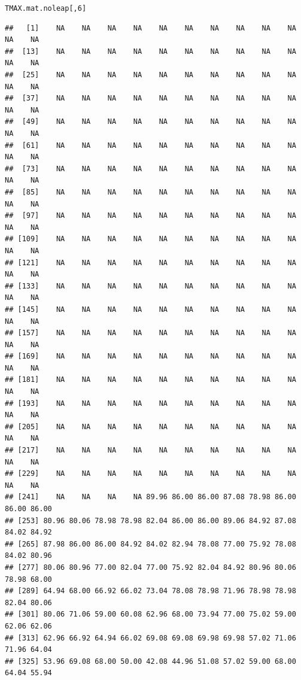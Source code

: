 \documentclass{article}\usepackage[]{graphicx}\usepackage[]{color}
\makeatletter
\newcommand{\hlnum}[1]{\textcolor[rgb]{0.686,0.059,0.569}{#1}}%
\newcommand{\hlstd}[1]{\textcolor[rgb]{0.345,0.345,0.345}{#1}}%
\newenvironment{kframe}{%
 \def\at@end@of@kframe{}%
 \ifinner\ifhmode%
  \def\at@end@of@kframe{\end{minipage}}%
  \begin{minipage}{\columnwidth}%
 \fi\fi%
 \def\FrameCommand##1{\hskip\@totalleftmargin \hskip-\fboxsep
 \colorbox{shadecolor}{##1}\hskip-\fboxsep
     \hskip-\linewidth \hskip-\@totalleftmargin \hskip\columnwidth}%
 \MakeFramed {\advance\hsize-\width
   \@totalleftmargin\z@ \linewidth\hsize
   \@setminipage}}%
 {\par\unskip\endMakeFramed%
 \at@end@of@kframe}
\newenvironment{knitrout}{}{} %
\makeatother
\begin{document}
\begin{knitrout}
\begin{kframe}
{\ttfamily\noindent\bfseries\color{errorcolor}{\#\# Error in `[<-`(`*tmp*`, j, year.seq\$Col[year.seq\$Year == i], value = CHCND.noleap\$TMAX[CHCND.noleap\$Year == : subscript out of bounds}}\begin{alltt}
\hlstd{TMAX.mat.noleap[,}\hlnum{6}\hlstd{]}
\end{alltt}
\begin{verbatim}
##   [1]    NA    NA    NA    NA    NA    NA    NA    NA    NA    NA    NA    NA
##  [13]    NA    NA    NA    NA    NA    NA    NA    NA    NA    NA    NA    NA
##  [25]    NA    NA    NA    NA    NA    NA    NA    NA    NA    NA    NA    NA
##  [37]    NA    NA    NA    NA    NA    NA    NA    NA    NA    NA    NA    NA
##  [49]    NA    NA    NA    NA    NA    NA    NA    NA    NA    NA    NA    NA
##  [61]    NA    NA    NA    NA    NA    NA    NA    NA    NA    NA    NA    NA
##  [73]    NA    NA    NA    NA    NA    NA    NA    NA    NA    NA    NA    NA
##  [85]    NA    NA    NA    NA    NA    NA    NA    NA    NA    NA    NA    NA
##  [97]    NA    NA    NA    NA    NA    NA    NA    NA    NA    NA    NA    NA
## [109]    NA    NA    NA    NA    NA    NA    NA    NA    NA    NA    NA    NA
## [121]    NA    NA    NA    NA    NA    NA    NA    NA    NA    NA    NA    NA
## [133]    NA    NA    NA    NA    NA    NA    NA    NA    NA    NA    NA    NA
## [145]    NA    NA    NA    NA    NA    NA    NA    NA    NA    NA    NA    NA
## [157]    NA    NA    NA    NA    NA    NA    NA    NA    NA    NA    NA    NA
## [169]    NA    NA    NA    NA    NA    NA    NA    NA    NA    NA    NA    NA
## [181]    NA    NA    NA    NA    NA    NA    NA    NA    NA    NA    NA    NA
## [193]    NA    NA    NA    NA    NA    NA    NA    NA    NA    NA    NA    NA
## [205]    NA    NA    NA    NA    NA    NA    NA    NA    NA    NA    NA    NA
## [217]    NA    NA    NA    NA    NA    NA    NA    NA    NA    NA    NA    NA
## [229]    NA    NA    NA    NA    NA    NA    NA    NA    NA    NA    NA    NA
## [241]    NA    NA    NA    NA 89.96 86.00 86.00 87.08 78.98 86.00 86.00 86.00
## [253] 80.96 80.06 78.98 78.98 82.04 86.00 86.00 89.06 84.92 87.08 84.02 84.92
## [265] 87.98 86.00 86.00 84.92 84.02 82.94 78.08 77.00 75.92 78.08 84.02 80.96
## [277] 80.06 80.96 77.00 82.04 77.00 75.92 82.04 84.92 80.96 80.06 78.98 68.00
## [289] 64.94 68.00 66.92 66.02 73.04 78.08 78.98 71.96 78.98 78.98 82.04 80.06
## [301] 80.06 71.06 59.00 60.08 62.96 68.00 73.94 77.00 75.02 59.00 62.06 62.06
## [313] 62.96 66.92 64.94 66.02 69.08 69.08 69.98 69.98 57.02 71.06 71.96 64.04
## [325] 53.96 69.08 68.00 50.00 42.08 44.96 51.08 57.02 59.00 68.00 64.04 55.94

\end{verbatim}
\end{kframe}
\end{knitrout}
\end{document}
